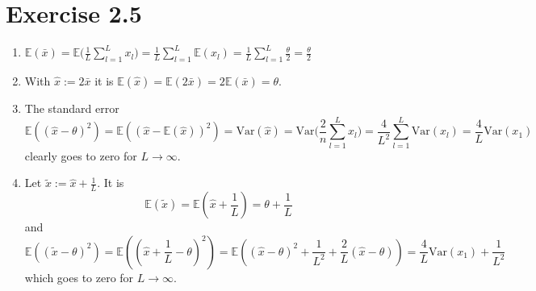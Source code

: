 \documentclass[11pt]{article} %
\newcommand{\E}{\mathbb{E}}
\newcommand{\Var}{\mathrm{Var}}
\begin{document}
\section*{Exercise 2.5}
\begin{enumerate}[label= (\alph*) \;]
  \item $ \displaystyle
    \E(\bar x) = \E\Big( \frac 1 L \sum_{l=1}^L x_l \Big)
    = \frac 1 L \sum_{l=1}^L \E(x_l)
    = \frac 1 L \sum_{l=1}^L \frac \theta 2
    = \frac \theta 2$

  \item With $\hat x := 2 \bar x$ it is
    $\E(\hat x) = \E(2 \bar x) = 2 \E(\bar x) = \theta$.

  \item The standard error
    \[ \displaystyle
      \E((\hat x - \theta)^2)
      = \E((\hat x - \E(\hat x))^2)
      = \Var(\hat x)
      = \Var\Big( \frac 2 n \sum_{l=1}^L x_l \Big)
      = \frac{4}{L^2} \sum_{l=1}^L \Var(x_l)
      = \frac 4 L \Var(x_1)
    \]
    clearly goes to zero for $L \to \infty$.

  \item Let $\tilde x := \hat x + \frac 1 L$. It is
    \[
      \E(\tilde x)
      = \E(\hat x + \frac 1 L)
      = \theta + \frac 1 L
    \]
    and
    \[
      \E((\tilde x - \theta)^2)
      = \E((\hat x + \frac 1 L - \theta)^2)
      = \E((\hat x - \theta)^2 + \frac{1}{L^2} + \frac 2 L (\hat x - \theta))
      = \frac 4 L \Var(x_1) + \frac{1}{L^2}
    \]
    which goes to zero for $L \to \infty$.
\end{enumerate}
\end{document}
